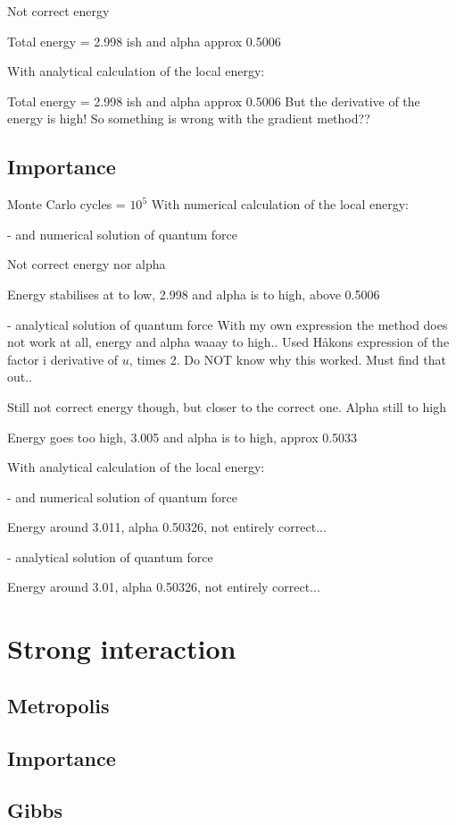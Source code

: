 Not correct energy

Total energy = 2.998 ish and alpha approx 0.5006

With analytical calculation of the local energy:

Total energy = 2.998 ish and alpha approx 0.5006
But the derivative of the energy is high! So something is wrong with the gradient method??

\subsection{Importance}
Monte Carlo cycles = $10^5$
With numerical calculation of the local energy:

- and numerical solution of quantum force

Not correct energy nor alpha

Energy stabilises at to low, 2.998 and alpha is to high, above 0.5006
 
- analytical solution of quantum force
With my own expression the method does not work at all, energy and alpha waaay to high..
Used Håkons expression of the factor i derivative of $u$, times 2. Do NOT know why this worked. Must find that out.. 

Still not correct energy though, but closer to the correct one. Alpha still to high

Energy goes too high, 3.005 and alpha is to high, approx 0.5033

With analytical calculation of the local energy:

- and numerical solution of quantum force

Energy around 3.011, alpha 0.50326, not entirely correct...
 
- analytical solution of quantum force

Energy around 3.01, alpha 0.50326, not entirely correct...

\section{Strong interaction}
\subsection{Metropolis}


\subsection{Importance}


\subsection{Gibbs}
